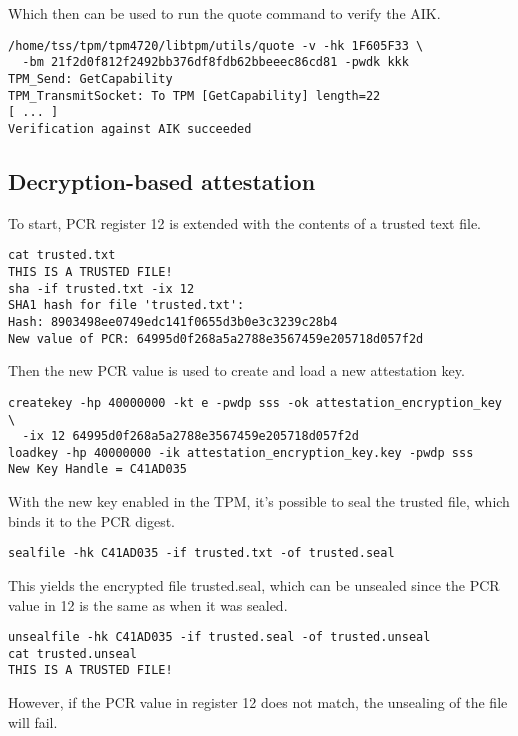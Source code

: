 \documentclass[10pt]{article}
\begin{document}
    Which then can be used to run the quote command to verify the AIK.

\begin{verbatim}
/home/tss/tpm/tpm4720/libtpm/utils/quote -v -hk 1F605F33 \
  -bm 21f2d0f812f2492bb376df8fdb62bbeeec86cd81 -pwdk kkk
TPM_Send: GetCapability
TPM_TransmitSocket: To TPM [GetCapability] length=22
[ ... ]
Verification against AIK succeeded
\end{verbatim}

  \subsection{Decryption-based attestation}

    To start, PCR register 12 is extended with the contents of a trusted text
    file.

\begin{verbatim}
cat trusted.txt
THIS IS A TRUSTED FILE!
sha -if trusted.txt -ix 12
SHA1 hash for file 'trusted.txt':
Hash: 8903498ee0749edc141f0655d3b0e3c3239c28b4
New value of PCR: 64995d0f268a5a2788e3567459e205718d057f2d
\end{verbatim}

    Then the new PCR value is used to create and load  a new attestation key.

\begin{verbatim}
createkey -hp 40000000 -kt e -pwdp sss -ok attestation_encryption_key \
  -ix 12 64995d0f268a5a2788e3567459e205718d057f2d
loadkey -hp 40000000 -ik attestation_encryption_key.key -pwdp sss
New Key Handle = C41AD035
\end{verbatim}

    With the new key enabled in the TPM, it's possible to seal the trusted
    file, which binds it to the PCR digest.

\begin{verbatim}
sealfile -hk C41AD035 -if trusted.txt -of trusted.seal
\end{verbatim}

    This yields the encrypted file trusted.seal, which can be unsealed since
    the PCR value in 12 is the same as when it was sealed.

\begin{verbatim}
unsealfile -hk C41AD035 -if trusted.seal -of trusted.unseal
cat trusted.unseal
THIS IS A TRUSTED FILE!
\end{verbatim}

    However, if the PCR value in register 12 does not match, the unsealing of
    the file will fail.
\end{document}
